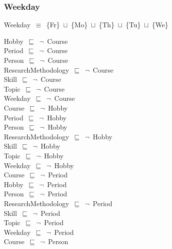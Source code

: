 \documentclass{article}
\begin{document}
\subsubsection*{Weekday}

Weekday~\ensuremath{\equiv}~\{Fr\}~\ensuremath{\sqcup}~\{Mo\}~\ensuremath{\sqcup}~\{Th\}~\ensuremath{\sqcup}~\{Tu\}~\ensuremath{\sqcup}~\{We\}

Hobby~\ensuremath{\sqsubseteq}~\ensuremath{\lnot}~Course\\
Period~\ensuremath{\sqsubseteq}~\ensuremath{\lnot}~Course\\
Person~\ensuremath{\sqsubseteq}~\ensuremath{\lnot}~Course\\
ResearchMethodology~\ensuremath{\sqsubseteq}~\ensuremath{\lnot}~Course\\
Skill~\ensuremath{\sqsubseteq}~\ensuremath{\lnot}~Course\\
Topic~\ensuremath{\sqsubseteq}~\ensuremath{\lnot}~Course\\
Weekday~\ensuremath{\sqsubseteq}~\ensuremath{\lnot}~Course\\
Course~\ensuremath{\sqsubseteq}~\ensuremath{\lnot}~Hobby\\
Period~\ensuremath{\sqsubseteq}~\ensuremath{\lnot}~Hobby\\
Person~\ensuremath{\sqsubseteq}~\ensuremath{\lnot}~Hobby\\
ResearchMethodology~\ensuremath{\sqsubseteq}~\ensuremath{\lnot}~Hobby\\
Skill~\ensuremath{\sqsubseteq}~\ensuremath{\lnot}~Hobby\\
Topic~\ensuremath{\sqsubseteq}~\ensuremath{\lnot}~Hobby\\
Weekday~\ensuremath{\sqsubseteq}~\ensuremath{\lnot}~Hobby\\
Course~\ensuremath{\sqsubseteq}~\ensuremath{\lnot}~Period\\
Hobby~\ensuremath{\sqsubseteq}~\ensuremath{\lnot}~Period\\
Person~\ensuremath{\sqsubseteq}~\ensuremath{\lnot}~Period\\
ResearchMethodology~\ensuremath{\sqsubseteq}~\ensuremath{\lnot}~Period\\
Skill~\ensuremath{\sqsubseteq}~\ensuremath{\lnot}~Period\\
Topic~\ensuremath{\sqsubseteq}~\ensuremath{\lnot}~Period\\
Weekday~\ensuremath{\sqsubseteq}~\ensuremath{\lnot}~Period\\
Course~\ensuremath{\sqsubseteq}~\ensuremath{\lnot}~Person\\
\end{document}
